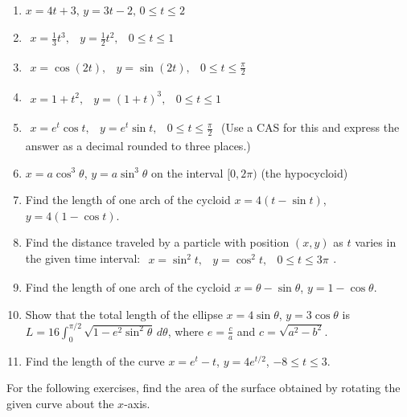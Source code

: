 \documentclass{exercises}
\begin{document}
\begin{enumerate}[resume]
\item $x=4t+3,\,y=3t-2,\,0\le t\le2$
\item $\begin{matrix}x=\frac{1}{3}t^{3}, & y=\frac{1}{2}t^{2}, & 0\le t\le1\end{matrix}$
\item $\begin{matrix}x=\cos(2t), & y=\sin(2t), & 0\le t\le \frac{\pi}{2}\end{matrix}$
\item $\begin{matrix}x=1+t^{2}, & y={(1+t)}^{3}, & 0\le t\le1\end{matrix}$
\item $\begin{matrix}x=e^{t}\cos t, & y=e^{t}\sin t, & 0\le t\le \frac{\pi}{2}\end{matrix}$ (Use a CAS for this and express the answer as a decimal rounded to three places.)
\item $x=a\cos^{3}\theta$, $y=a\sin^{3}\theta$ on the interval $[0,2\pi)$ (the hypocycloid)
\item Find the length of one arch of the cycloid $x=4(t-\sin t)$, $y=4(1-\cos t)$.
\item Find the distance traveled by a particle with position $(x,y)$ as $t$ varies in the given time interval: $\begin{matrix}x=\sin^{2}t, & y=\cos^{2}t, & 0\le t\le3\pi \end{matrix}$.
\item Find the length of one arch of the cycloid $x=\theta-\sin \theta$, $y=1-\cos \theta$.
\item Show that the total length of the ellipse $x=4\sin \theta$, $y=3\cos \theta$ is $L=16\int_{0}^{\pi/2}\sqrt{1-e^{2}\sin^{2}\theta}\,d\theta$, where $e=\frac{c}{a}$ and $c=\sqrt{a^{2}-b^{2}}$.
\item Find the length of the curve $x=e^{t}-t$, $y=4e^{t/2}$, $-8\le t\le3$.
\end{enumerate}

For the following exercises, find the area of the surface obtained by rotating the given curve about the $x$-axis.
\end{document}
